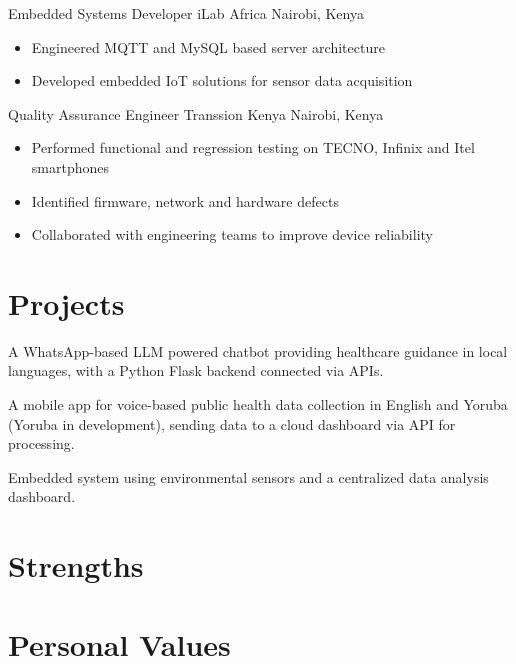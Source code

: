 \documentclass[11pt,a4paper]{moderncv}
\begin{document}
{Embedded Systems Developer}
{iLab Africa}
{Nairobi, Kenya}
{}
{\begin{itemize}
\item Engineered MQTT and MySQL based server architecture
\item Developed embedded IoT solutions for sensor data acquisition
\end{itemize}}

{Quality Assurance Engineer}
{Transsion Kenya}
{Nairobi, Kenya}
{}
{\begin{itemize}
\item Performed functional and regression testing on TECNO, Infinix and Itel smartphones
\item Identified firmware, network and hardware defects
\item Collaborated with engineering teams to improve device reliability
\end{itemize}}

\section{Projects}

{A WhatsApp-based LLM powered chatbot providing healthcare guidance in local languages, with a Python Flask backend connected via APIs.}

{A mobile app for voice-based public health data collection in English and Yoruba (Yoruba in development), sending data to a cloud dashboard via API for processing.}

{Embedded system using environmental sensors and a centralized data analysis dashboard.}

\section{Strengths}


\section{Personal Values}
\end{document}
